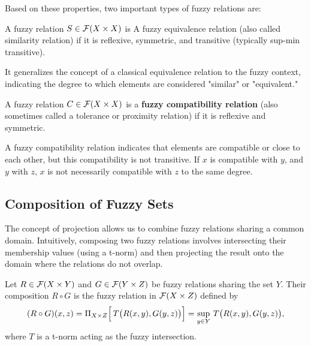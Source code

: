 Based on these properties, two important types of fuzzy relations are:

\begin{definition}
  A fuzzy relation $S \in \mathcal{F}(X \times X)$ is A fuzzy equivalence relation (also called similarity relation) if it is reflexive, symmetric, and transitive (typically sup-min transitive).
\end{definition}
It generalizes the concept of a classical equivalence relation to the fuzzy context, indicating the degree to which elements are considered "similar" or "equivalent."

\begin{definition}
  A fuzzy relation $C \in \mathcal{F}(X \times X)$ is a \textbf{fuzzy compatibility relation} (also sometimes called a tolerance or proximity relation) if it is reflexive and symmetric.
\end{definition}
A fuzzy compatibility relation indicates that elements are compatible or close to each other, but this compatibility is not transitive. If $x$ is compatible with $y$, and $y$ with $z$, $x$ is not necessarily compatible with $z$ to the same degree.










\subsection{Composition of Fuzzy Sets}
\label{sec:compos}

The concept of projection allows us to combine fuzzy relations sharing a common domain. Intuitively, composing two fuzzy relations involves intersecting their membership values (using a t-norm) and then projecting the result onto the domain where the relations do not overlap.

\begin{definition}\label{def:compos}
    Let \( R \in \mathcal{F}(X \times Y) \) and \( G \in \mathcal{F}(Y \times Z) \) be fuzzy relations sharing the set \(Y\). Their composition \( R \circ G \) is the fuzzy relation in \(\mathcal{F}(X \times Z)\) defined by
    \[
    (R \circ G)(x,z) = \Pi_{X\times Z}\Bigl[\, T\bigl(R(x,y), G(y,z)\bigr) \Bigr] = \sup_{y\in Y}\, T\bigl(R(x,y), G(y,z)\bigr),
    \]
    where \(T\) is a t-norm acting as the fuzzy intersection.
\end{definition}

